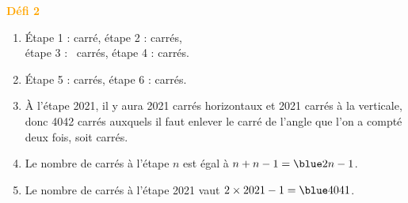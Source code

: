 \begin{colonne*exercice}
\begin{corrige}
\hspace*{-7.5mm} \textcolor{orange}{\bf Défi 2} \\
   \begin{enumerate}
      \item Étape 1 : { carré}, étape 2 : { carrés}, \\
         étape 3 : {~carrés}, étape 4 : { carrés}.
      \item Étape 5 : { carrés}, étape 6 : { carrés}.
      \item À l'étape 2021, il y aura 2021 carrés horizontaux et 2021 carrés à la verticale, donc 4042 carrés auxquels il faut enlever le carré de l'angle que l'on a compté deux fois, soit { carrés}.
      \item Le nombre de carrés à l'étape $n$ est égal à $n+n-1 ={\blue 2n-1}$.
      \item Le nombre de carrés à l'étape 2021 vaut $2\times2021-1 ={\blue 4041}$.
   \end{enumerate}

\end{corrige}


\end{colonne*exercice}


\Recreation

\enigme[Défis !!!] \medskip

